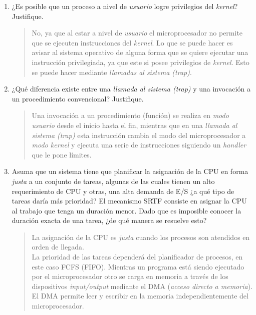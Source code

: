 \documentclass[a4paper,10pt,spanish]{article}
\begin{document}
\begin{enumerate}[1.]
\item ¿Es posible que un proceso a nivel de \textit{usuario} logre privilegios del \textit{kernel}? Justifique.

\begin{quote}
No, ya que al estar a nivel de \textit{usuario} el microprocesador no permite que se ejecuten instrucciones del \textit{kernel}. Lo que se puede hacer es avisar al sistema operativo de alguna forma que se quiere ejecutar una instrucción privilegiada, ya que este si posee privilegios de \textit{kernel}. Esto se puede hacer mediante \textit{llamadas al sistema (trap)}.
\end{quote}

\item ¿Qué diferencia existe entre una \textit{llamada al sistema (trap)} y una invocación a un procedimiento convencional? Justifique.

\begin{quote}
Una invocación a un procedimiento (función) se realiza en \textit{modo usuario} desde el inicio hasta el fin, mientras que en una \textit{llamada al sistema (trap)} esta instrucción cambia el modo del microprocesador a \textit{modo kernel} y ejecuta una serie de instrucciones siguiendo un \textit{handler} que le pone límites.
\end{quote}

\item Asuma que un sistema tiene que planificar la asignación de la CPU en forma \textit{justa} a un conjunto de tareas, algunas de las cuales tienen un alto requerimiento de CPU y otras, una alta demanda de E/S ¿a qué tipo de tareas daría más prioridad? El mecanismo SRTF consiste en asignar la CPU al trabajo que tenga un duración menor. Dado que es imposible conocer la duración exacta de una tarea, ¿de qué manera se resuelve esto?

\begin{quote}
La asignación de la CPU es \textit{justa} cuando los procesos son atendidos en orden de llegada. \\

La prioridad de las tareas dependerá del planificador de procesos, en este caso FCFS (FIFO). Mientras un programa está siendo ejecutado por el microprocesador otro se carga en memoria a través de los dispositivos \textit{input/output} mediante el DMA (\textit{acceso directo a memoria}). \\

El DMA permite leer y escribir en la memoria independientemente del microprocesador. \\


\end{quote}
\end{enumerate}
\end{document}
